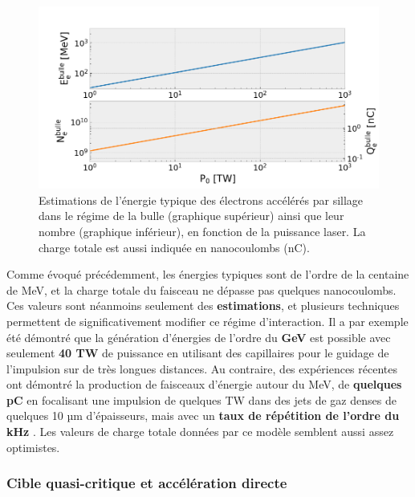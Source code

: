 \begin{refsection}
\begin{figure}[hbtp]
    \centering
    \includegraphics[width=0.7\linewidth]{2-laser/scaling_Gordienko.png}
    \caption{Estimations de l'énergie typique des électrons accélérés par sillage dans le régime de la bulle (graphique supérieur) ainsi que leur nombre (graphique inférieur), en fonction de la puissance laser. La charge totale est aussi indiquée en nanocoulombs (nC).}
    \label{fig:2-scaling_Gordienko}
\end{figure}

Comme évoqué précédemment, les énergies typiques sont de l'ordre de la centaine de MeV, et la charge totale du faisceau ne dépasse pas quelques nanocoulombs. Ces valeurs sont néanmoins seulement des \textbf{estimations}, et plusieurs techniques permettent de significativement modifier ce régime d'interaction. Il a par exemple été démontré que la génération d'énergies de l'ordre du \textbf{GeV} est possible avec seulement \textbf{40 TW} de puissance \parencite{leemans_2006} en utilisant des capillaires pour le guidage de l'impulsion sur de très longues distances. Au contraire, des expériences récentes ont démontré la production de faisceaux d'énergie autour du MeV, de \textbf{quelques pC} en focalisant une impulsion de quelques TW dans des jets de gaz denses de quelques 10 µm d'épaisseurs, mais avec un \textbf{taux de répétition de l'ordre du kHz} \parencite{faure_2019}. Les valeurs de charge totale données par ce modèle semblent aussi assez optimistes.

\subsubsection{Cible quasi-critique et accélération directe}


\end{refsection}
